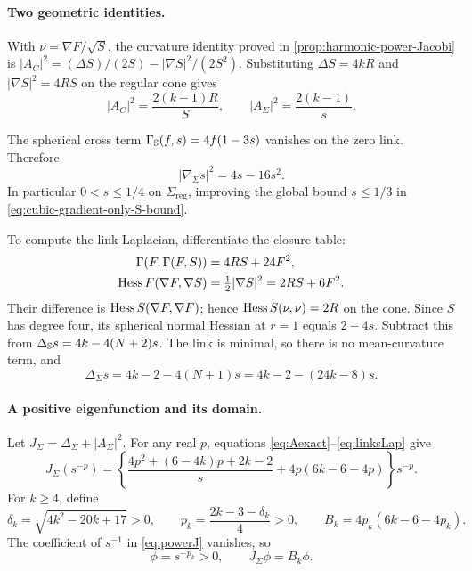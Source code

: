 \paragraph{Two geometric identities.}
With \(\nu=\nabla F/\sqrt S\), the curvature identity proved in
\cref{prop:harmonic-power-Jacobi} is
\(|A_C|^2=(\Delta S)/(2S)-|\nabla S|^2/(2S^2)\).
Substituting \(\Delta S=4kR\) and \(|\nabla S|^2=4RS\)
on the regular cone gives
\begin{equation}\label{eq:Aexact}
 |A_C|^2=\frac{2(k-1)R}{S},\qquad
 |A_\Sigma|^2=\frac{2(k-1)}s.
\end{equation}

The spherical cross term \(\Gamma_{\mathbb S}(f,s)=4f(1-3s)\) vanishes on
the zero link. Therefore
\begin{equation}\label{eq:linksgrad}
 |\nabla_\Sigma s|^2=4s-16s^2.
\end{equation}
In particular \(0<s\leq1/4\) on \(\Sigma_{\mathrm{reg}}\), improving
the global bound \(s\leq1/3\) in
\eqref{eq:cubic-gradient-only-S-bound}.

To compute the link Laplacian, differentiate the closure table:
\begin{align*}
 \Gamma(F,\Gamma(F,S))&=4RS+24F^2,\\
 \operatorname{Hess} F(\nabla F,\nabla S)&=\tfrac12|\nabla S|^2=2RS+6F^2.
\end{align*}
Their difference is \(\operatorname{Hess} S(\nabla F,\nabla F)\); hence
\(\operatorname{Hess} S(\nu,\nu)=2R\) on the cone. Since \(S\) has degree four,
its spherical normal Hessian at \(r=1\) equals \(2-4s\).
Subtract this from \(\Delta_{\mathbb S}s=4k-4(N+2)s\). The link is minimal,
so there is no mean-curvature term, and
\begin{equation}\label{eq:linksLap}
 \Delta_\Sigma s=4k-2-4(N+1)s
 =4k-2-(24k-8)s.
\end{equation}

\paragraph{A positive eigenfunction and its domain.}
Let \(J_\Sigma=\Delta_\Sigma+|A_\Sigma|^2\).
For any real \(p\), equations \eqref{eq:Aexact}--\eqref{eq:linksLap} give
\begin{equation}\label{eq:powerJ}
 J_\Sigma(s^{-p})
 =\left\{\frac{4p^2+(6-4k)p+2k-2}{s}
           +4p(6k-6-4p)\right\}s^{-p}.
\end{equation}
For \(k\geq4\), define
\begin{equation}\label{eq:p}
 \delta_k=\sqrt{4k^2-20k+17}>0,\qquad
 p_k=\frac{2k-3-\delta_k}{4}>0,\qquad
 B_k=4p_k(6k-6-4p_k).
\end{equation}
The coefficient of \(s^{-1}\) in \eqref{eq:powerJ} vanishes, so
\begin{equation}\label{eq:eig}
 \phi=s^{-p_k}>0,\qquad J_\Sigma\phi=B_k\phi.
\end{equation}

